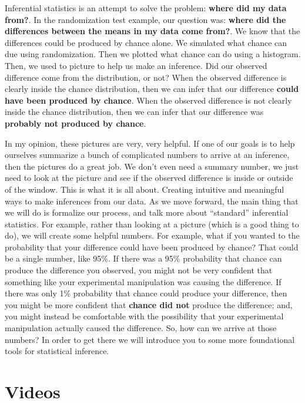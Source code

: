 \documentclass[]{book}
\begin{document}
Inferential statistics is an attempt to solve the problem: \textbf{where did my data from?}. In the randomization test example, our question was: \textbf{where did the differences between the means in my data come from?}. We know that the differences could be produced by chance alone. We simulated what chance can due using randomization. Then we plotted what chance can do using a histogram. Then, we used to picture to help us make an inference. Did our observed difference come from the distribution, or not? When the observed difference is clearly inside the chance distribution, then we can infer that our difference \textbf{could have been produced by chance}. When the observed difference is not clearly inside the chance distribution, then we can infer that our difference was \textbf{probably not produced by chance}.

In my opinion, these pictures are very, very helpful. If one of our goals is to help ourselves summarize a bunch of complicated numbers to arrive at an inference, then the pictures do a great job. We don't even need a summary number, we just need to look at the picture and see if the observed difference is inside or outside of the window. This is what it is all about. Creating intuitive and meaningful ways to make inferences from our data. As we move forward, the main thing that we will do is formalize our process, and talk more about ``standard'' inferential statistics. For example, rather than looking at a picture (which is a good thing to do), we will create some helpful numbers. For example, what if you wanted to the probability that your difference could have been produced by chance? That could be a single number, like 95\%. If there was a 95\% probability that chance can produce the difference you observed, you might not be very confident that something like your experimental manipulation was causing the difference. If there was only 1\% probability that chance could produce your difference, then you might be more confident that \textbf{chance did not} produce the difference; and, you might instead be comfortable with the possibility that your experimental manipulation actually caused the difference. So, how can we arrive at those numbers? In order to get there we will introduce you to some more foundational tools for statistical inference.

\hypertarget{videos}{%
\section{Videos}\label{videos}}
\end{document}
